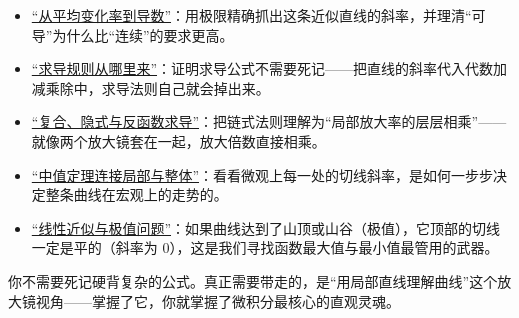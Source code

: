 \begin{itemize}
\tightlist
\item
  \hyperref[sec:02-Calculus/03-Differentiation/01]{``从平均变化率到导数''}：用极限精确抓出这条近似直线的斜率，并理清“可导”为什么比“连续”的要求更高。
\item
  \hyperref[sec:02-Calculus/03-Differentiation/02]{``求导规则从哪里来''}：证明求导公式不需要死记——把直线的斜率代入代数加减乘除中，求导法则自己就会掉出来。
\item
  \hyperref[sec:02-Calculus/03-Differentiation/03]{``复合、隐式与反函数求导''}：把链式法则理解为“局部放大率的层层相乘”——就像两个放大镜套在一起，放大倍数直接相乘。
\item
  \hyperref[sec:02-Calculus/03-Differentiation/04]{``中值定理连接局部与整体''}：看看微观上每一处的切线斜率，是如何一步步决定整条曲线在宏观上的走势的。
\item
  \hyperref[sec:02-Calculus/03-Differentiation/05]{``线性近似与极值问题''}：如果曲线达到了山顶或山谷（极值），它顶部的切线一定是平的（斜率为 0），这是我们寻找函数最大值与最小值最管用的武器。
\end{itemize}

你不需要死记硬背复杂的公式。真正需要带走的，是“用局部直线理解曲线”这个放大镜视角——掌握了它，你就掌握了微积分最核心的直观灵魂。